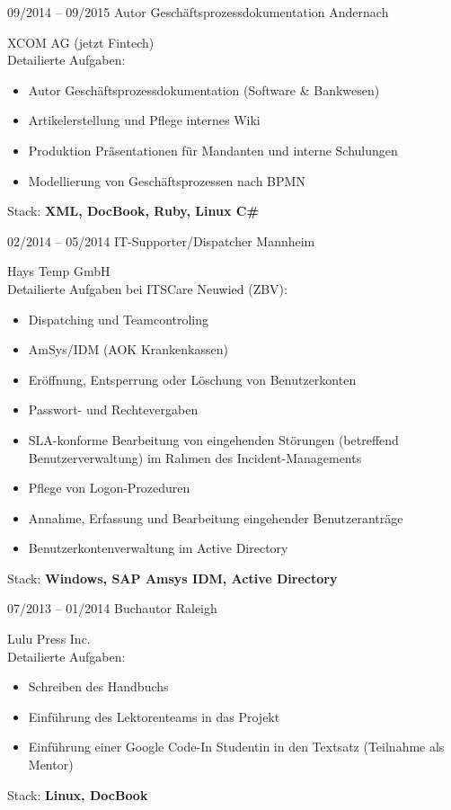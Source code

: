 \documentclass[a4paper]{friggeri-cv} %
\begin{document}
\begin{entrylist}
\entry
{09/2014 -- 09/2015}
{Autor Geschäftsprozessdokumentation}
{Andernach}
{XCOM AG (jetzt Fintech) \\
	Detailierte Aufgaben:
	\begin{itemize}
		\item Autor Geschäftsprozessdokumentation (Software \& Bankwesen)
		\item Artikelerstellung und Pflege internes Wiki
		\item Produktion Präsentationen für Mandanten und interne Schulungen
		\item Modellierung von Geschäftsprozessen nach BPMN
	\end{itemize}
	Stack: \textbf{XML, DocBook, Ruby, Linux C\#}
}
\entry
{02/2014 -- 05/2014}
{IT-Supporter/Dispatcher}
{Mannheim}
{Hays Temp GmbH \\
    Detailierte Aufgaben bei ITSCare Neuwied (ZBV):
    \begin{itemize}
        \item Dispatching und Teamcontroling
        \item AmSys/IDM (AOK Krankenkassen)
        \item Eröffnung, Entsperrung oder Löschung von Benutzerkonten
        \item Passwort- und Rechtevergaben
        \item SLA-konforme Bearbeitung von eingehenden Störungen (betreffend Benutzerverwaltung) im Rahmen des Incident-Managements
        \item Pflege von Logon-Prozeduren
        \item Annahme, Erfassung und Bearbeitung eingehender Benutzeranträge
        \item Benutzerkontenverwaltung im Active Directory
    \end{itemize}
		Stack: \textbf{Windows, SAP Amsys IDM, Active Directory}
}
\entry
{07/2013 -- 01/2014}
{Buchautor}
{Raleigh}
{Lulu Press Inc.\\
    Detailierte Aufgaben:
    \begin{itemize}
        \item Schreiben des Handbuchs
        \item Einführung des Lektorenteams in das Projekt
        \item Einführung einer Google Code-In Studentin in den Textsatz (Teilnahme als Mentor)
    \end{itemize}
		Stack: \textbf{Linux, DocBook}
}
\end{entrylist}
\end{document}
